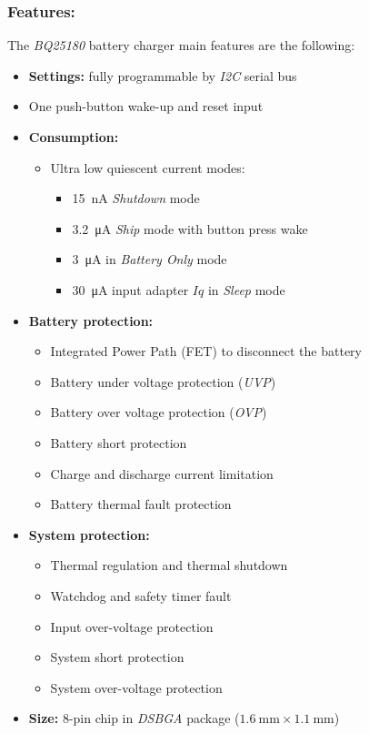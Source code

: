 \documentclass[report.tex]{subfiles}
\begin{document}
\subsubsection{Features:}
The \textit{BQ25180}\cite{bq25180DS} battery charger main features are the following:
\begin{itemize}
\item \textbf{Settings:} fully programmable by \textit{I2C} serial bus
\item One push-button wake-up and reset input
\item \textbf{Consumption:}
\begin{itemize}
\item Ultra low quiescent current modes:
\begin{itemize}
\item \SI{15}{\nano\ampere} \textit{Shutdown} mode
\item \SI{3.2}{\micro\ampere} \textit{Ship} mode with button press wake
\item \SI{3}{\micro\ampere} in \textit{Battery Only} mode
\item \SI{30}{\micro\ampere} input adapter $Iq$ in \textit{Sleep} mode
\end{itemize}
\end{itemize}
\item \textbf{Battery protection:}
\begin{itemize}
\item Integrated Power Path (FET) to disconnect the battery
\item Battery under voltage protection (\textit{UVP})
\item Battery over voltage protection (\textit{OVP})
\item Battery short protection
\item Charge and discharge current limitation
\item Battery thermal fault protection
\end{itemize}
\item \textbf{System protection:}
\begin{itemize}
\item Thermal regulation and thermal shutdown
\item Watchdog and safety timer fault
\item Input over-voltage protection
\item System short protection
\item System over-voltage protection
\end{itemize}
\item \textbf{Size:} 8-pin chip in \textit{DSBGA} package ($\SI{1.6}{\milli\meter}\times\SI{1.1}{\milli\meter}$)\\
\end{itemize}
\end{document}
